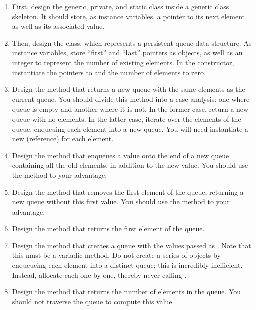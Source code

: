 \begin{enumerate}[label=(\alph*)]
    \item First, design the generic, private, and static class  inside a generic  class skeleton. It should store, as instance variables, a pointer to its next element as well as its associated value.
    \item Then, design the  class, which represents a persistent queue data structure. As instance variables, store ``first'' and ``last'' pointers as  objects, as well as an integer to represent the number of existing elements. In the constructor, instantiate the pointers to  and the number of elements to zero.
    \item Design the  method that returns a new queue with the same elements as the current queue. You should divide this method into a case analysis: one where  queue is empty and another where it is not. In the former case, return a new queue with no elements. In the latter case, iterate over the elements of the queue, enqueuing each element into a new queue. You will need instantiate a new  (reference) for each element.
    \item Design the  method that enqueues a value onto the end of a new queue containing all the old elements, in addition to the new value. You should use the  method to your advantage.
    \item Design the  method that removes the first element of the queue, returning a new queue without this first value. You should use the  method to your advantage.
    \item Design the  method that returns the first element of the queue.
    \item Design the  method that creates a queue with the values passed as . Note that this must be a variadic method. Do not create a series of  objects by enqueueing each element into a distinct queue; this is incredibly inefficient. Instead, allocate each  one-by-one, thereby never calling .
    \item Design the  method that returns the number of elements in the queue. You should not traverse the queue to compute this value. 
\end{enumerate}


